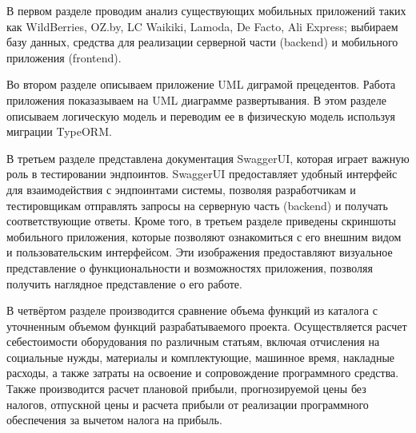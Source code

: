 В первом разделе
проводим анализ существующих мобильных приложений таких как
WildBerries, OZ.by, LC Waikiki, Lamoda, De Facto, Ali Express;
выбираем базу данных, средства для реализации серверной части (backend) и мобильного приложения (frontend).

Во втором разделе
описываем приложение UML диграмой прецедентов.
Работа приложения показазываем на UML диаграмме развертывания.
В этом разделе описываем логическую модель и переводим ее в физическую модель используя миграции TypeORM.

В третьем разделе
представлена документация SwaggerUI, которая играет важную роль в тестировании эндпоинтов.
SwaggerUI предоставляет удобный интерфейс для взаимодействия с эндпоинтами системы,
позволяя разработчикам и тестировщикам отправлять запросы на серверную часть (backend)
и получать соответствующие ответы.
Кроме того, в третьем разделе приведены скриншоты мобильного приложения,
которые позволяют ознакомиться с его внешним видом и пользовательским интерфейсом.
Эти изображения предоставляют визуальное представление о функциональности и возможностях приложения,
позволяя получить наглядное представление о его работе.

В четвёртом разделе
производится сравнение объема функций из каталога с уточненным объемом функций разрабатываемого проекта.
Осуществляется расчет себестоимости оборудования по различным статьям,
включая отчисления на социальные нужды, материалы и комплектующие,
машинное время, накладные расходы, а также затраты на освоение и сопровождение программного средства.
Также производится расчет плановой прибыли, прогнозируемой цены без налогов, отпускной цены и
расчета прибыли от реализации программного обеспечения за вычетом налога на прибыль.





